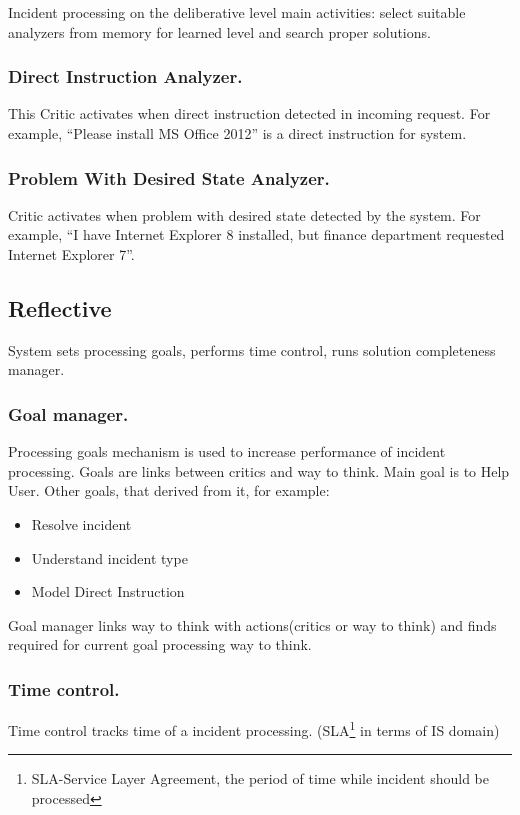 \documentclass[runningheads,a4paper]{llncs}
\begin{document}
Incident processing on the deliberative level main activities: select suitable analyzers from memory for learned level and search proper solutions.

\subsubsection{Direct Instruction Analyzer.} This Critic activates when direct instruction detected in incoming request. For example, “Please install MS Office 2012” is a direct instruction for system.
\subsubsection{Problem With Desired State Analyzer.} Critic activates when problem with desired state detected by the system. For example, “I have Internet Explorer 8 installed, but finance department requested Internet Explorer 7”.

\subsection{Reflective}

System sets processing goals, performs time control, runs solution completeness manager.

\subsubsection{Goal manager.} Processing goals mechanism is used to increase performance of incident processing. Goals are links between critics and way to think. Main goal is to Help User. Other goals, that derived from it, for example:
\begin{itemize}
 \item Resolve incident
 \item Understand incident type
 \item Model Direct Instruction
\end{itemize}
Goal manager links way to think with actions(critics or way to think) and finds required for current goal processing way to think.

\subsubsection{Time control.} Time control tracks time of a incident processing. (SLA\footnote{SLA-Service Layer Agreement, the period of time while incident should be processed} in terms of IS domain)
\end{document}
